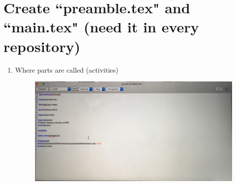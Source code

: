 \documentclass{ximera}
\begin{document}
\section{Create ``preamble.tex" and ``main.tex" (need it in every repository)}
\begin{enumerate}
\item Where parts are called (activities)
\begin{center}
\begin{figure}
\includegraphics[scale=.07]{images/main}
\end{figure}
\end{center}
\end{enumerate}
\end{document}
